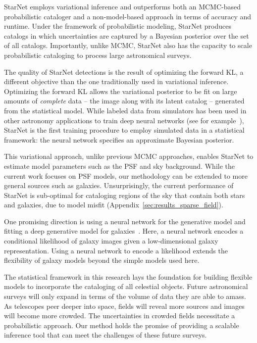 StarNet employs variational inference and outperforms both an MCMC-based probabilistic cataloger and a non-model-based approach in terms of accuracy and runtime. 
Under the framework of probabilistic modeling, 
StarNet produces catalogs in which uncertainties are captured by a Bayesian posterior over the set of all catalogs.
Importantly, unlike MCMC, StarNet also has the capacity to scale probabilistic cataloging to process large astronomical surveys. 

The quality of StarNet detections is the result of optimizing the forward KL, a different objective than the one traditionally used in variational inference. 
Optimizing the forward KL allows the variational posterior to be fit on large amounts of {\itshape complete} data -- the image along with its latent catalog -- generated from the statistical model. 
While labeled data from simulators has been used in other astronomy applications to train deep neural networks (see for example~\cite{Lanusse_2017_cmudeeplens, huang2019finding}), StarNet is the first training procedure to employ simulated data in a statistical framework: the neural network specifies an approximate Bayesian posterior. 

This variational approach, unlike previous MCMC approaches, enables StarNet to estimate model parameters such as the PSF and sky background.
While the current work focuses on PSF models, our methodology can be extended to more general sources such as galaxies. 
Unsurprisingly, the current performance of StarNet is sub-optimal for cataloging regions of the sky that contain both stars and galaxies, due to model misfit (Appendix~\ref{sec:results_sparse_field}).  

One promising direction is using a neural network for the generative model and fitting a deep generative model for galaxies~\cite{Arcelin_2020, lanusse2020deep, Reiman_2019_gans_deblend, Regier2015ADG}. 
Here, a neural network encodes a conditional likelihood of galaxy images given a low-dimensional galaxy representation. 
Using a neural network to encode a likelihood extends the flexibility of galaxy models beyond the simple models used here. 


The statistical framework in this research lays the foundation for building flexible models to incorporate the cataloging of all celestial objects. 
Future astronomical surveys will only expand in terms of the volume of data they are able to amass. 
As telescopes peer deeper into space, fields will reveal more sources and images will become more crowded. 
The uncertainties in crowded fields necessitate a probabilistic approach. 
Our method holds the promise of providing  a scalable inference tool that can meet the challenges of these future surveys. 


